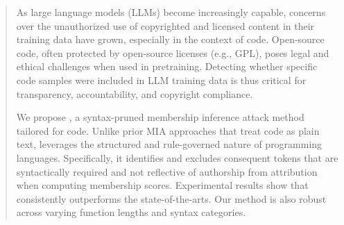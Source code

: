 

\begin{abstract}


As large language models (LLMs) become increasingly capable, concerns over the unauthorized use of copyrighted and licensed content in their training data have grown, especially in the context of code. Open-source code, often protected by open-source licenses (e.g., GPL), poses legal and ethical challenges when used in pretraining. Detecting whether specific code samples were included in LLM training data is thus critical for transparency, accountability, and copyright compliance.

We propose \tool, a syntax-pruned membership inference attack method tailored for code. Unlike prior MIA approaches that treat code as plain text, \tool leverages the structured and rule-governed nature of programming languages. Specifically, it identifies and excludes consequent tokens that are syntactically required and not reflective of authorship from attribution when computing membership scores. Experimental results show that \tool consistently outperforms the state-of-the-arts.%
Our method is also robust across varying function lengths and syntax categories. %

\end{abstract}


